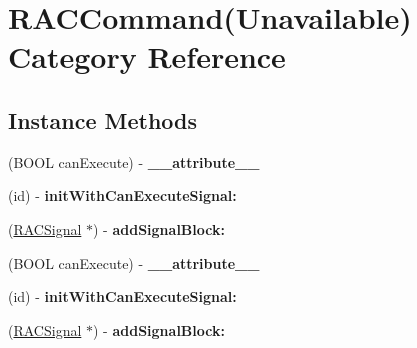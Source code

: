 \hypertarget{category_r_a_c_command_07_unavailable_08}{}\section{R\+A\+C\+Command(Unavailable) Category Reference}
\label{category_r_a_c_command_07_unavailable_08}
\subsection*{Instance Methods}
\begin{DoxyCompactItemize}
\item 
\mbox{\label{category_r_a_c_command_07_unavailable_08_a04ae9adc3ae100157db54a18f6b72668}} 
(B\+O\+OL can\+Execute) -\/ {\bfseries \+\_\+\+\_\+attribute\+\_\+\+\_\+}
\item 
\mbox{\label{category_r_a_c_command_07_unavailable_08_ad8e41d37764bb5f4c46c48d90914765e}} 
(id) -\/ {\bfseries init\+With\+Can\+Execute\+Signal\+:}
\item 
\mbox{\label{category_r_a_c_command_07_unavailable_08_a1cf11afe113e8e4855c9317856df0be2}} 
(\mbox{\hyperlink{interface_r_a_c_signal}{R\+A\+C\+Signal}} $\ast$) -\/ {\bfseries add\+Signal\+Block\+:}
\item 
\mbox{\label{category_r_a_c_command_07_unavailable_08_a04ae9adc3ae100157db54a18f6b72668}} 
(B\+O\+OL can\+Execute) -\/ {\bfseries \+\_\+\+\_\+attribute\+\_\+\+\_\+}
\item 
\mbox{\label{category_r_a_c_command_07_unavailable_08_ad8e41d37764bb5f4c46c48d90914765e}} 
(id) -\/ {\bfseries init\+With\+Can\+Execute\+Signal\+:}
\item 
\mbox{\label{category_r_a_c_command_07_unavailable_08_a1cf11afe113e8e4855c9317856df0be2}} 
(\mbox{\hyperlink{interface_r_a_c_signal}{R\+A\+C\+Signal}} $\ast$) -\/ {\bfseries add\+Signal\+Block\+:}
\item 
\mbox{\label{category_r_a_c_command_07_unavailable_08_a04ae9adc3ae100157db54a18f6b72668}} 

\end{DoxyCompactItemize}
